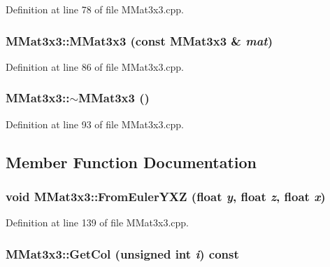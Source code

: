Definition at line 78 of file MMat3x3.cpp.\hypertarget{class_m_mat3x3_be15ae144f6155954faf29c683f9fe72}{
\subsubsection[{MMat3x3}]{\setlength{\rightskip}{0pt plus 5cm}MMat3x3::MMat3x3 (const {\bf MMat3x3} \& {\em mat})}}
\label{class_m_mat3x3_be15ae144f6155954faf29c683f9fe72}




Definition at line 86 of file MMat3x3.cpp.\hypertarget{class_m_mat3x3_b08b8249982271bc69924bbb325037ba}{
\subsubsection[{$\sim$MMat3x3}]{\setlength{\rightskip}{0pt plus 5cm}MMat3x3::$\sim$MMat3x3 ()}}
\label{class_m_mat3x3_b08b8249982271bc69924bbb325037ba}




Definition at line 93 of file MMat3x3.cpp.

\subsection{Member Function Documentation}
\hypertarget{class_m_mat3x3_b28ee4ae5b4e8278bdad52dfc62d70d7}{
\subsubsection[{FromEulerYXZ}]{\setlength{\rightskip}{0pt plus 5cm}void MMat3x3::FromEulerYXZ (float {\em y}, \/  float {\em z}, \/  float {\em x})}}
\label{class_m_mat3x3_b28ee4ae5b4e8278bdad52dfc62d70d7}




Definition at line 139 of file MMat3x3.cpp.\hypertarget{class_m_mat3x3_fec431f74f2796faa5abfdffd767f841}{
\subsubsection[{GetCol}]{ MMat3x3::GetCol (unsigned int {\em i}) const}}
\label{class_m_mat3x3_fec431f74f2796faa5abfdffd767f841}




